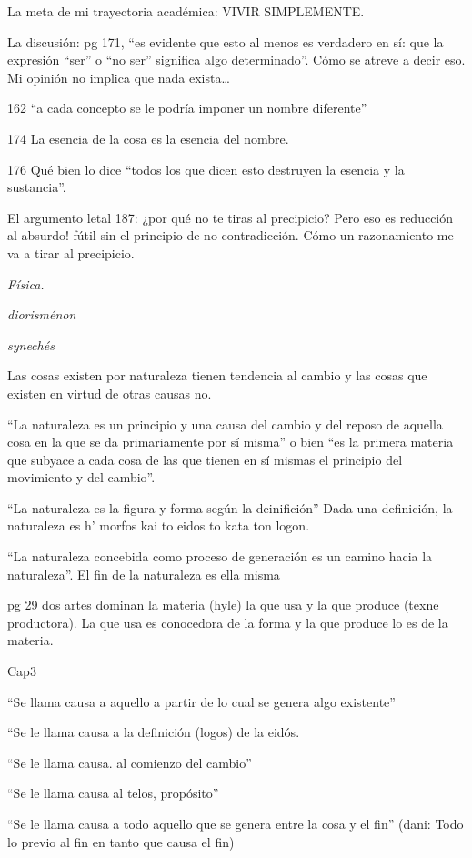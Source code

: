 La meta de mi trayectoria académica: VIVIR
SIMPLEMENTE.

La discusión: pg 171, ``es evidente que esto
al menos es verdadero en sí: que la expresión
``ser'' o ``no ser'' significa algo
determinado''. Cómo se atreve a decir eso. Mi
opinión no implica que nada exista\ldots{}

162 ``a cada concepto se le podría imponer un
nombre diferente''

174 La esencia de la cosa es la esencia del
nombre.

176 Qué bien lo dice ``todos los que dicen
esto destruyen la esencia y la sustancia''.

El argumento letal 187: ¿por qué no te tiras
al precipicio? Pero eso es reducción al
absurdo! fútil sin el principio de no
contradicción. Cómo un razonamiento me va a
tirar al precipicio.

\medskip\noindent\emph{Física.}

\emph{diorisménon}

\emph{synechés}

Las cosas existen por naturaleza tienen
tendencia al cambio y las cosas que existen
en virtud de otras causas no.

``La naturaleza es un principio y una causa
del cambio y del reposo de aquella cosa en la
que se da primariamente por sí misma'' o bien
``es la primera materia que subyace a cada
cosa de las que tienen en sí mismas el
principio del movimiento y del cambio''.

``La naturaleza es la figura y forma según la
deinifición'' Dada una definición, la
naturaleza es h' morfos kai to eidos to kata
ton logon.

``La naturaleza concebida como proceso de
generación es un camino hacia la
naturaleza''. El fin de la naturaleza es ella
misma

pg 29 dos artes dominan la materia (hyle) la
que usa y la que produce (texne productora).
La que usa es conocedora de la forma y la que
produce lo es de la materia.

Cap3

``Se llama causa a aquello a partir de lo
cual se genera algo existente''

``Se le llama causa a la definición (logos)
de la eidós.

``Se le llama causa. al comienzo del cambio''

``Se le llama causa al telos, propósito''

``Se le llama causa a todo aquello que se
genera entre la cosa y el fin'' (dani: Todo
lo previo al fin en tanto que causa el fin)

